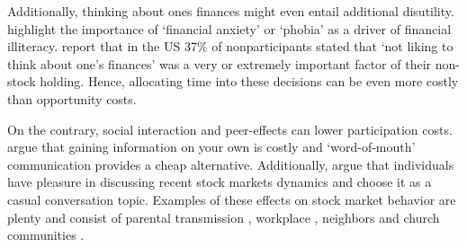 \documentclass[ProjectABM]{subfiles}
\begin{document}
Additionally, thinking about ones finances might even entail additional disutility. \cite{shapiro_burchell_2012} highlight the importance of `financial anxiety' or `phobia' as a driver of financial illiteracy. \cite{choi_2020} report that in the US 37\% of nonparticipants stated that `not liking to think about one's finances' was a very or extremely important factor of their non-stock holding. Hence, allocating time into these decisions can be even more costly than opportunity costs.



On the contrary, social interaction and peer-effects can lower participation costs. %
\cite{brown_2008} argue that gaining information on your own is costly and `word-of-mouth' communication provides a cheap alternative. Additionally, \cite{hong_et_al_2004social} argue that individuals have pleasure in discussing recent stock markets dynamics and choose it as a casual conversation topic. Examples of these effects on stock market behavior are plenty and consist of parental transmission \citep{CS2000_parental}, workplace \citep{duflo_saez2002_workplace}, neighbors and church communities \citep{hong_et_al_2004social, brown_2008}.




\end{document}
